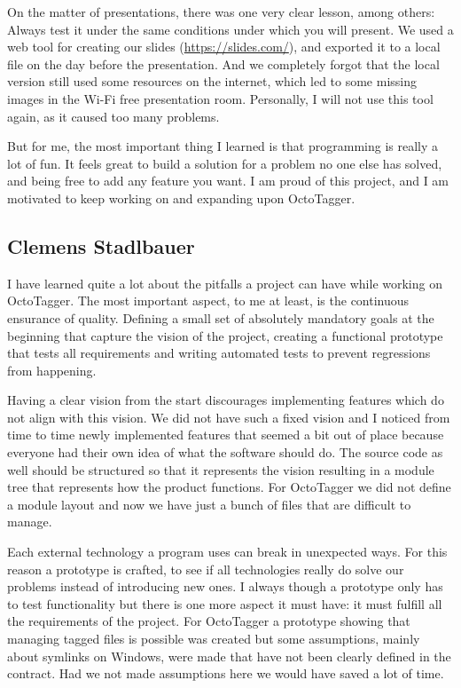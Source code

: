 On the matter of presentations, there was one very clear lesson, among others: Always test it under the same conditions under which you will present. We used a web tool for creating our slides (\url{https://slides.com/}), and exported it to a local file on the day before the presentation. And we completely forgot that the local version still used some resources on the internet, which led to some missing images in the Wi-Fi free presentation room. Personally, I will not use this tool again, as it caused too many problems.

But for me, the most important thing I learned is that programming is really a lot of fun. It feels great to build a solution for a problem no one else has solved, and being free to add any feature you want. I am proud of this project, and I am motivated to keep working on and expanding upon OctoTagger.

\subsection{Clemens Stadlbauer}

I have learned quite a lot about the pitfalls a project can have while working
on OctoTagger. The most important aspect, to me at least, is the continuous
ensurance of quality. Defining a small set of absolutely mandatory goals at the
beginning that capture the vision of the project, creating a functional
prototype that tests all requirements and writing automated tests to prevent
regressions from happening.

Having a clear vision from the start discourages implementing features which do
not align with this vision. We did not have such a fixed vision and I noticed
from time to time newly implemented features that seemed a bit out of place
because everyone had their own idea of what the software should do. The source
code as well should be structured so that it represents the vision resulting
in a module tree that represents how the product functions. For OctoTagger we
did not define a module layout and now we have just a bunch of files that are
difficult to manage.

Each external technology a program uses can break in unexpected ways. For this
reason a prototype is crafted, to see if all technologies really do solve our
problems instead of introducing new ones. I always though a prototype only has
to test functionality but there is one more aspect it must have: it must fulfill
all the requirements of the project. For OctoTagger a prototype showing that
managing tagged files is possible was created but some assumptions, mainly about
symlinks on Windows, were made that have not been clearly defined in the
contract. Had we not made assumptions here we would have saved a lot of time.

